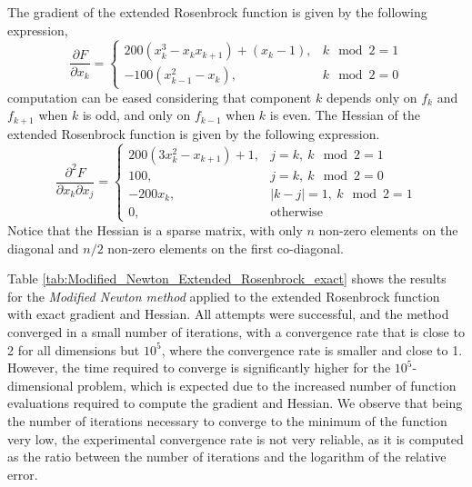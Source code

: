 The gradient of the extended Rosenbrock function is given by the following expression,
\begin{equation}
    \frac{\partial F}{\partial x_k} = 
    \left \{ \begin{array}{ll}
    200(x_k^3 - x_kx_{k+1}) + (x_k - 1), & k\mod 2 = 1\\
    -100(x_{k-1}^2 - x_k), & k\mod 2 = 0
    \end{array} \right .
\end{equation}
computation can be eased considering that component $k$ depends only on $f_k$ and $f_{k+1}$ when $k$ is odd, and only on $f_{k-1}$ when $k$ is even.
The Hessian of the extended Rosenbrock function is given by the following expression.
\begin{equation}
    \frac{\partial^2 F}{\partial x_k \partial x_j} = 
    \left \{ \begin{array}{ll}
    200(3x_k^2 - x_{k+1}) + 1, & j = k,\ k\mod 2 = 1\\
    100, & j = k,\ k\mod 2 = 0\\
    -200x_k, & \lvert k-j \rvert = 1,\ k\mod 2 = 1\\
    0, & \text{otherwise}
    \end{array} \right .
\end{equation}
Notice that the Hessian is a sparse matrix, with only $n$ non-zero elements on the diagonal and $n/2$ non-zero elements on the first co-diagonal.

Table \ref{tab:Modified_Newton_Extended_Rosenbrock_exact} shows the results for the \textit{Modified Newton method} applied to the extended Rosenbrock function with exact gradient and Hessian.
All attempts were successful, and the method converged in a small number of iterations, with a convergence rate that is close to 2 for all dimensions but $10^5$, where the convergence rate is smaller and close to 1.
However, the time required to converge is significantly higher for the $10^5$-dimensional problem, which is expected due to the increased number of function evaluations required to compute the gradient and Hessian.
We observe that being the number of iterations necessary to converge to the minimum of the function very low, the experimental convergence rate is not very reliable, as it is computed as the ratio between the number of iterations and the logarithm of the relative error.

